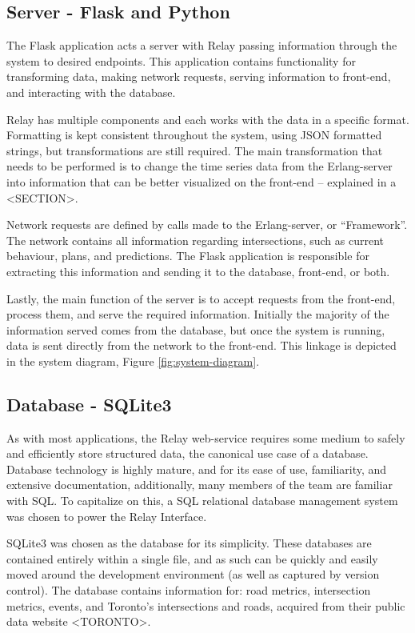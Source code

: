 \documentclass{report}
\begin{document}
\subsection{Server - Flask and Python}
The Flask application acts a server with Relay passing information through the system to desired endpoints. This application contains functionality for transforming data, making network requests, serving information to front-end, and interacting with the database.

	Relay has multiple components and each works with the data in a specific format. Formatting is kept consistent throughout the system, using JSON formatted strings, but transformations are still required. The main transformation that needs to be performed is to change the time series data from the Erlang-server into information that can be better visualized on the front-end – explained in a <SECTION>.

	Network requests are defined by calls made to the Erlang-server, or “Framework”. The network contains all information regarding intersections, such as current behaviour, plans, and predictions. The Flask application is responsible for extracting this information and sending it to the database, front-end, or both.

	Lastly, the main function of the server is to accept requests from the front-end, process them, and serve the required information. Initially the majority of the information served comes from the database, but once the system is running, data is sent directly from the network to the front-end. This linkage is depicted in the system diagram, Figure \ref{fig:system-diagram}.

\subsection{Database - SQLite3}

As with most applications, the Relay web-service requires some medium to safely and efficiently store structured data, the canonical use case of a database.
Database technology is highly mature, and for its ease of use, familiarity, and extensive documentation, additionally, many members of the team are familiar with SQL.
To capitalize on this, a SQL relational database management system was chosen to power the Relay Interface.

SQLite3 was chosen as the database for its simplicity. 
These databases are contained entirely within a single file, and as such can be quickly and easily moved around the development environment (as well as captured by version control). 
The database contains information for: road metrics, intersection metrics, events, and Toronto's intersections and roads, acquired from their public data website <TORONTO>.
\end{document}
